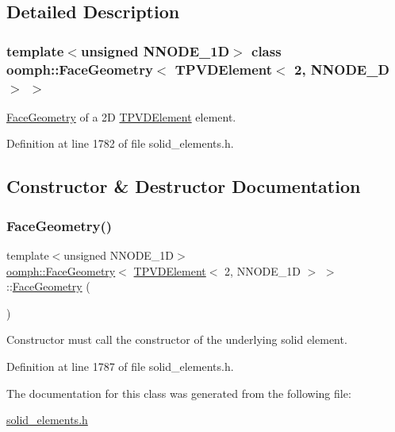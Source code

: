 \subsection{Detailed Description}
\subsubsection*{template$<$unsigned N\+N\+O\+D\+E\+\_\+1D$>$\newline
class oomph\+::\+Face\+Geometry$<$ T\+P\+V\+D\+Element$<$ 2, N\+N\+O\+D\+E\+\_\+D $>$ $>$}

\hyperlink{classoomph_1_1FaceGeometry}{Face\+Geometry} of a 2D \hyperlink{classoomph_1_1TPVDElement}{T\+P\+V\+D\+Element} element. 

Definition at line 1782 of file solid\+\_\+elements.\+h.



\subsection{Constructor \& Destructor Documentation}
\mbox{\label{classoomph_1_1FaceGeometry_3_01TPVDElement_3_012_00_01NNODE__1D_01_4_01_4_a22440667c020defb3a91671020147892}} 
\subsubsection{\texorpdfstring{Face\+Geometry()}{FaceGeometry()}}
{\footnotesize\ttfamily template$<$unsigned N\+N\+O\+D\+E\+\_\+1D$>$ \\
\hyperlink{classoomph_1_1FaceGeometry}{oomph\+::\+Face\+Geometry}$<$ \hyperlink{classoomph_1_1TPVDElement}{T\+P\+V\+D\+Element}$<$ 2, N\+N\+O\+D\+E\+\_\+1D $>$ $>$\+::\hyperlink{classoomph_1_1FaceGeometry}{Face\+Geometry} (\begin{DoxyParamCaption}{ }\end{DoxyParamCaption})\hspace{0.3cm}{\ttfamily [inline]}}



Constructor must call the constructor of the underlying solid element. 



Definition at line 1787 of file solid\+\_\+elements.\+h.



The documentation for this class was generated from the following file\+:\begin{DoxyCompactItemize}
\item 
\hyperlink{solid__elements_8h}{solid\+\_\+elements.\+h}\end{DoxyCompactItemize}
